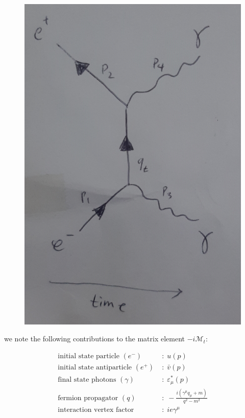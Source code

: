 \documentclass[11pt]{article}
\theoremstyle{definition}
\begin{document}
\begin{figure}[H]
    \centering
    \includegraphics[scale = 0.1]{final t-channel.jpg}
\end{figure}

we note the following contributions to the matrix element $-i\mathcal{M}_t$:

\begin{align*}
    \text{initial state particle }(e^{-}) \; &: \; u(p)\\
    \text{initial state antiparticle }(e^{+}) \; &: \; \bar{v}(p)\\
    \text{final state photons }(\gamma) \; &: \; \varepsilon^{*}_{\mu}(p)\\
    \text{fermion propagator }(q) \; &: \; -\frac{i(\gamma^{\mu} q_{\mu} + m)}{q^2-m^2}\\
    \text{interaction vertex factor } \; &: \; ie\gamma^{\mu}\\
\end{align*}
\end{document}
